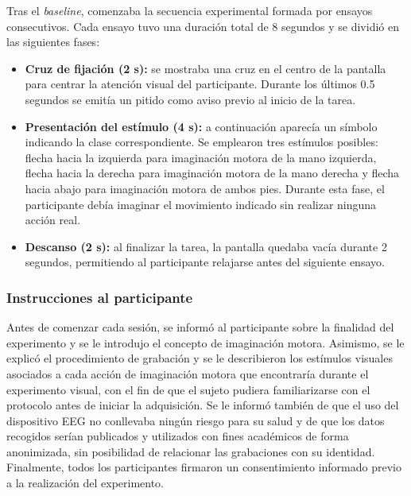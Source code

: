 Tras el \textit{baseline}, comenzaba la secuencia experimental formada por ensayos consecutivos. Cada ensayo tuvo una duración total de 8 segundos y se dividió en las siguientes fases:

\begin{itemize}
    \item \textbf{Cruz de fijación (2 s):} se mostraba una cruz en el centro de la pantalla para centrar la atención visual del participante. Durante los últimos 0.5 segundos se emitía un pitido como aviso previo al inicio de la tarea.
    
    \item \textbf{Presentación del estímulo (4 s):} a continuación aparecía un símbolo indicando la clase correspondiente. Se emplearon tres estímulos posibles: flecha hacia la izquierda para imaginación motora de la mano izquierda, flecha hacia la derecha para imaginación motora de la mano derecha y flecha hacia abajo para imaginación motora de ambos pies. Durante esta fase, el participante debía imaginar el movimiento indicado sin realizar ninguna acción real.
    
    \item \textbf{Descanso (2 s):} al finalizar la tarea, la pantalla quedaba vacía durante 2 segundos, permitiendo al participante relajarse antes del siguiente ensayo.
\end{itemize}


\subsubsection{Instrucciones al participante}

Antes de comenzar cada sesión, se informó al participante sobre la finalidad del experimento y se le introdujo el concepto de imaginación motora. Asimismo, se le explicó el procedimiento de grabación y se le describieron los estímulos visuales asociados a cada acción de imaginación motora que encontraría durante el experimento visual, con el fin de que el sujeto pudiera familiarizarse con el protocolo antes de iniciar la adquisición. Se le informó también de que el uso del dispositivo EEG no conllevaba ningún riesgo para su salud y de que los datos recogidos serían publicados y utilizados con fines académicos de forma anonimizada, sin posibilidad de relacionar las grabaciones con su identidad. Finalmente, todos los participantes firmaron un consentimiento informado previo a la realización del experimento.

